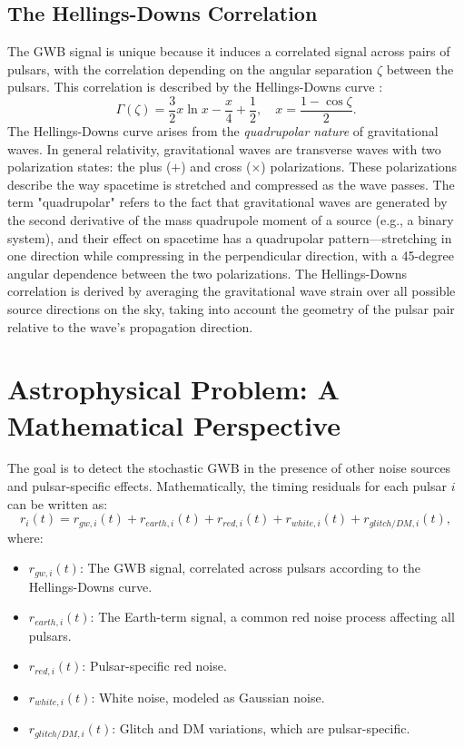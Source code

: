\documentclass[11pt]{article}
\begin{document}
\subsection{The Hellings-Downs Correlation}
The GWB signal is unique because it induces a correlated signal across pairs of pulsars, with the correlation depending on the angular separation $\zeta$ between the pulsars. This correlation is described by the Hellings-Downs curve \citep{hellings1983}:
\[
\Gamma(\zeta) = \frac{3}{2} x \ln x - \frac{x}{4} + \frac{1}{2}, \quad x = \frac{1 - \cos \zeta}{2}.
\]
The Hellings-Downs curve arises from the \textit{quadrupolar nature} of gravitational waves. In general relativity, gravitational waves are transverse waves with two polarization states: the plus ($+$) and cross ($\times$) polarizations. These polarizations describe the way spacetime is stretched and compressed as the wave passes. The term "quadrupolar" refers to the fact that gravitational waves are generated by the second derivative of the mass quadrupole moment of a source (e.g., a binary system), and their effect on spacetime has a quadrupolar pattern—stretching in one direction while compressing in the perpendicular direction, with a 45-degree angular dependence between the two polarizations. The Hellings-Downs correlation is derived by averaging the gravitational wave strain over all possible source directions on the sky, taking into account the geometry of the pulsar pair relative to the wave’s propagation direction.

\section{Astrophysical Problem: A Mathematical Perspective}
The goal is to detect the stochastic GWB in the presence of other noise sources and pulsar-specific effects. Mathematically, the timing residuals for each pulsar $i$ can be written as:
\[
r_i(t) = r_{gw,i}(t) + r_{earth,i}(t) + r_{red,i}(t) + r_{white,i}(t) + r_{glitch/DM,i}(t),
\]
where:
\begin{itemize}
    \item $r_{gw,i}(t)$: The GWB signal, correlated across pulsars according to the Hellings-Downs curve.
    \item $r_{earth,i}(t)$: The Earth-term signal, a common red noise process affecting all pulsars.
    \item $r_{red,i}(t)$: Pulsar-specific red noise.
    \item $r_{white,i}(t)$: White noise, modeled as Gaussian noise.
    \item $r_{glitch/DM,i}(t)$: Glitch and DM variations, which are pulsar-specific.
\end{itemize}
\end{document}
